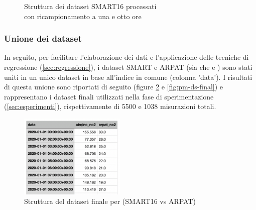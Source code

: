 \begin{figure}[H]%
    \centering
    \captionsetup{justification=centering}
    \caption{Struttura dei dataset SMART16 processati\\con ricampionamento a una e otto ore}%
    \label{fig:ris-prepro}%
\end{figure}

\subsubsection{Unione dei dataset}
In seguito, per facilitare l'elaborazione dei dati e l'applicazione delle tecniche di regressione (\ref{sec:regressione}), i dataset SMART e ARPAT (sia  che  e ) sono stati uniti in un unico dataset in base all'indice in comune (colonna 'data').
I risultati di questa unione sono riportati di seguito (figure \ref{fig:no2-ds-final} e \ref{fig:pm-ds-final}) e rappresentano i dataset finali utilizzati nella fase di sperimentazione (\ref{sec:esperimenti}), rispettivamente di 5500 e 1038 misurazioni totali.

\begin{figure}[H]
\centering
\captionsetup{justification=centering}
\includegraphics[width=0.45\textwidth,height=\textheight,keepaspectratio]{img/no2_ds_final}
\caption{Struttura del dataset finale per  (SMART16 vs ARPAT)}
\label{fig:no2-ds-final}
\end{figure}

